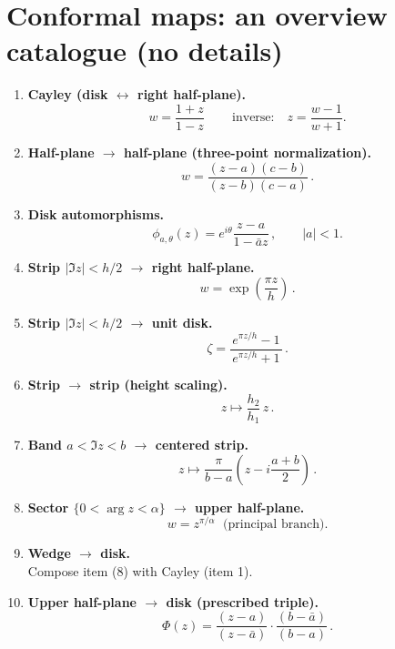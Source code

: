 \documentclass[11pt]{article}
\begin{document}
	
\section*{Conformal maps: an overview catalogue (no details)}

\begin{enumerate}
	\item \textbf{Cayley (disk $\leftrightarrow$ right half-plane).}\\[2pt]
	\[
	\boxed{\,w=\frac{1+z}{1-z}\,}\qquad\text{inverse:}\quad z=\frac{w-1}{w+1}.
	\]
	
	\item \textbf{Half-plane $\to$ half-plane (three-point normalization).}\\[2pt]
	\[
	\boxed{\,w=\frac{(z-a)(c-b)}{(z-b)(c-a)}\,}.
	\]
	
	\item \textbf{Disk automorphisms.}\\[2pt]
	\[
	\boxed{\,\phi_{a,\theta}(z)=e^{i\theta}\frac{z-a}{1-\bar a z}\,},\qquad |a|<1.
	\]
	
	\item \textbf{Strip $|\Im z|<h/2$ $\to$ right half-plane.}\\[2pt]
	\[
	\boxed{\,w=\exp\!\left(\frac{\pi z}{h}\right)\,}.
	\]
	
	\item \textbf{Strip $|\Im z|<h/2$ $\to$ unit disk.}\\[2pt]
	\[
	\boxed{\,\zeta=\frac{e^{\pi z/h}-1}{\,e^{\pi z/h}+1\,}\,}.
	\]
	
	\item \textbf{Strip $\to$ strip (height scaling).}\\[2pt]
	\[
	\boxed{\,z\mapsto \frac{h_2}{h_1}\,z\,}.
	\]
	
	\item \textbf{Band $a<\Im z<b$ $\to$ centered strip.}\\[2pt]
	\[
	\boxed{\,z\mapsto \frac{\pi}{b-a}\!\left(z-i\frac{a+b}{2}\right)\,}.
	\]
	
	\item \textbf{Sector $\{0<\arg z<\alpha\}$ $\to$ upper half-plane.}\\[2pt]
	\[
	\boxed{\,w=z^{\pi/\alpha}\,}\ \ \text{(principal branch)}.
	\]
	
	\item \textbf{Wedge $\to$ disk.}\\[2pt]
	Compose item (8) with Cayley (item 1).
	
	\item \textbf{Upper half-plane $\to$ disk (prescribed triple).}\\[2pt]
	\[
	\boxed{\,\Phi(z)=\frac{(z-a)}{(z-\bar a)}\cdot \frac{(b-\bar a)}{(b-a)}\,}.
	\]
	

\end{enumerate}
\end{document}
